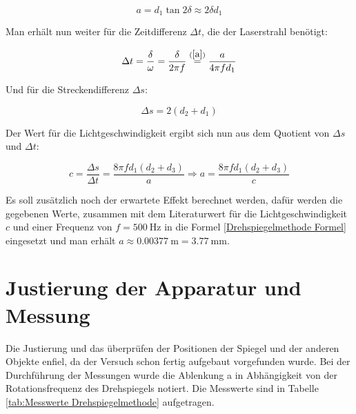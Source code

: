 \begin{equation} \label{a}
    a = d_1 \tan{2\delta} \approx 2\delta d_1
\end{equation}

Man erhält nun weiter für die Zeitdifferenz $\Delta t$, die der Laserstrahl benötigt:

\begin{equation}
    \Delta t = \frac{\delta}{\omega} = \frac{\delta}{2\pi f} \stackrel{(\ref{a})}{=} \frac{a}{4\pi f d_1}
\end{equation}

Und für die Streckendifferenz $\Delta s$:

\begin{equation}
    \Delta s = 2(d_2 + d_1)
\end{equation}

Der Wert für die Lichtgeschwindigkeit ergibt sich nun aus dem Quotient von $\Delta s$ und $\Delta t$:

\begin{equation} \label{Drehspiegelmethode Formel}
    c = \frac{\Delta s}{\Delta t} = \frac{8\pi f d_1 ( d_2 + d_3)}{a}
    \Rightarrow a = \frac{8 \pi f d_1 (d_2 + d_3)}{c}
\end{equation}

Es soll zusätzlich noch der erwartete Effekt berechnet werden, dafür werden die gegebenen Werte, zusammen mit dem Literaturwert für die Lichtgeschwindigkeit $c$ und einer Frequenz von $f = \SI{500}{\Hz}$ in die Formel \ref{Drehspiegelmethode Formel} eingesetzt und man erhält $a \approx \SI{0.00377}{\metre} = \SI{3.77}{\milli\metre}$.

\section{Justierung der Apparatur und Messung}

Die Justierung und das überprüfen der Positionen der Spiegel und der anderen Objekte enfiel, da der Versuch schon fertig aufgebaut vorgefunden wurde. Bei der Durchführung der Messungen wurde die Ablenkung a in Abhängigkeit von der Rotationsfrequenz des Drehspiegels notiert. Die Messwerte sind in Tabelle \ref{tab:Messwerte Drehspiegelmethode} aufgetragen.

